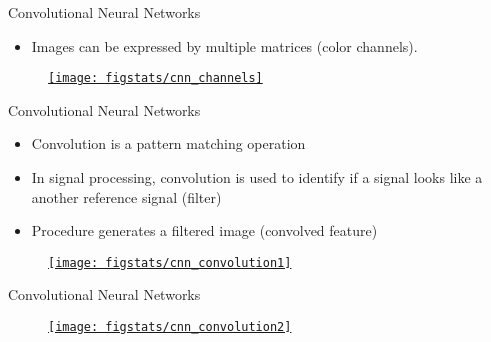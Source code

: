 \documentclass[9pt]{beamer}
\begin{document}
\begin{frame}{Convolutional Neural Networks}

\begin{itemize}
\item Images can be expressed by multiple matrices (color channels).
\end{itemize}

\begin{figure}[!htb]
    \centering
		\href{https://towardsdatascience.com/a-comprehensive-guide-to-convolutional-neural-networks-the-eli5-way-3bd2b1164a53}{\texttt{[image: figstats/cnn\_channels]}}
\end{figure}

\end{frame}

\begin{frame}{Convolutional Neural Networks}

\begin{itemize}
\item Convolution is a pattern matching operation 
\item In signal processing, convolution is used to identify if a signal looks like a another reference signal (filter)
\item Procedure generates a filtered image (convolved feature)
\end{itemize}


\begin{figure}[!htb]
    \centering
		\href{https://towardsdatascience.com/a-comprehensive-guide-to-convolutional-neural-networks-the-eli5-way-3bd2b1164a53}{\texttt{[image: figstats/cnn\_convolution1]}}
\end{figure}

\end{frame}

\begin{frame}{Convolutional Neural Networks}


\begin{figure}[!htb]
    \centering
		\href{https://towardsdatascience.com/a-comprehensive-guide-to-convolutional-neural-networks-the-eli5-way-3bd2b1164a53}{\texttt{[image: figstats/cnn\_convolution2]}}
\end{figure}

\end{frame}
\end{document}
